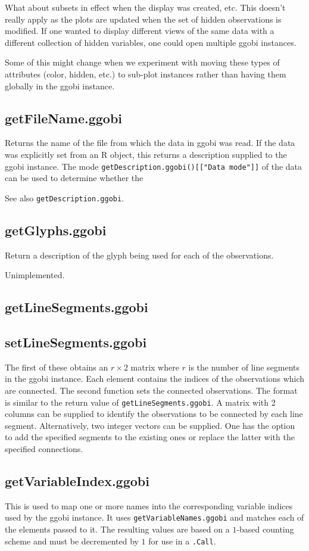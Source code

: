 \documentclass{article}
\def\SFunction#1{{\texttt{\red #1}}}
\begin{document}
What about subsets in effect when the display was created, etc.  This
doesn't really apply as the plots are updated when the set of hidden
observations is modified.  If one wanted to display different views of
the same data with a different collection of hidden variables, one
could open multiple ggobi instances.

Some of this might change when we experiment with moving these types
of attributes (color, hidden, etc.) to sub-plot instances rather than
having them globally in the ggobi instance.

\subsection{getFileName.ggobi}
Returns the name of the file from which the data in ggobi was read. If
the data was explicitly set from an R object, this returns a
description supplied to the ggobi instance. The mode
\SFunction{getDescription.ggobi()[["Data mode"]]} of the data can be
used to determine whether the

See also \SFunction{getDescription.ggobi}.

\subsection{getGlyphs.ggobi}
Return a description of the glyph
being used for each of the observations.

Unimplemented.

\subsection{getLineSegments.ggobi}
\subsection{setLineSegments.ggobi}
The first of these obtains an $r \times 2$ matrix where $r$ is the
number of line segments in the ggobi instance.  Each element contains
the indices of the observations which are connected.  The second
function sets the connected observations.  The format is similar to
the return value of \SFunction{getLineSegments.ggobi}.  A matrix with
2 columns can be supplied to identify the observations to be connected
by each line segment.  Alternatively, two integer vectors can be
supplied.  One has the option to add the specified segments to the
existing ones or replace the latter with the specified connections.

\subsection{getVariableIndex.ggobi}
This is used to map one or more names into the corresponding variable
indices used by the ggobi instance.  It uses
\SFunction{getVariableNames.ggobi} and matches each of the elements
passed to it.
The resulting values are based on a $1$-based
counting scheme and must be decremented by $1$ for
use in a \SFunction{.Call}.
\end{document}
